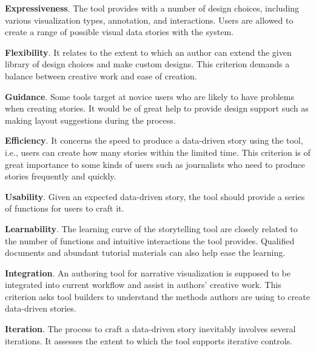 \begin{compactitem}
	\item \textbf{Expressiveness}.  The tool provides with a number of design choices, including various visualization types, annotation, and interactions. Users are allowed to create a range of possible visual data stories with the system.

\item \textbf{Flexibility}. It relates to the extent to which an author can extend the given library of design choices and make custom designs. This criterion demands a balance between creative work and ease of creation. 

\item \textbf{Guidance}. Some tools target at novice users who are likely to have problems when creating stories. It would be of great help to provide design support such as making layout suggestions during the process. 

\item \textbf{Efficiency}. It concerns the speed to produce a data-driven story using the tool, i.e., users can create how many stories within the limited time. This criterion is of great importance to some kinds of users such as journalists who need to produce stories frequently and quickly. 

\item \textbf{Usability}. Given an expected data-driven story, the tool should provide a series of functions for users to craft it.

\item \textbf{Learnability}. The learning curve of the storytelling tool are closely related to the number of functions and intuitive interactions the tool provides. Qualified documents and abundant tutorial materials can also help ease the learning. 

\item \textbf{Integration}. An authoring tool for narrative visualization is supposed to be integrated into current workflow and assist in authors' creative work. This criterion asks tool builders to understand the methods authors are using to create data-driven stories.

\item \textbf{Iteration}. The process to craft a data-driven story inevitably involves several iterations. It assesses the extent to which the tool supports iterative controls.

\end{compactitem}

